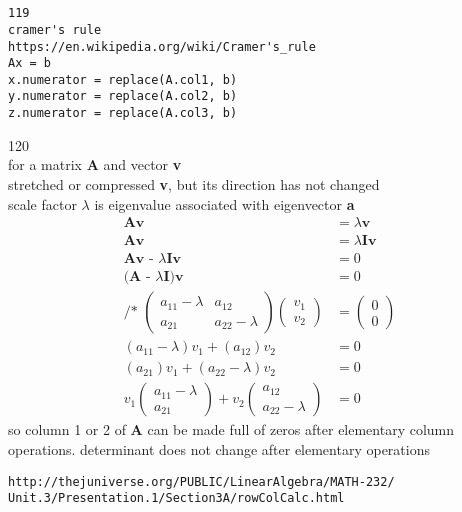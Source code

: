 \documentclass[12pt,border=4pt,multi]{article} %
\begin{document}
\section*{}
\begin{verbatim}
119
cramer's rule
https://en.wikipedia.org/wiki/Cramer's_rule
Ax = b
x.numerator = replace(A.col1, b)
y.numerator = replace(A.col2, b)
z.numerator = replace(A.col3, b)
\end{verbatim}
120\\
for a matrix \textbf{A} and vector \textbf{v}\\
stretched or compressed \textbf{v}, but its direction has not changed\\
scale factor $\lambda$ is eigenvalue associated with eigenvector \textbf{a}
\begin{align*}
\textbf{Av} &= \lambda\textbf{v}\\
\textbf{Av} &= \lambda\textbf{Iv}\\
\textbf{Av - $\lambda$Iv} &= 0\\
\textbf{(A - $\lambda$I)v} &= 0\\
\text{/* }
\begin{pmatrix}
a_{11} - \lambda & a_{12}\\
a_{21} & a_{22} - \lambda
\end{pmatrix}
\begin{pmatrix}
v_1\\
v_2
\end{pmatrix} &=
\begin{pmatrix}
0\\
0
\end{pmatrix}\\
(a_{11} - \lambda)v_1 + (a_{12})v_2 &= 0\\
(a_{21})v_1 + (a_{22} - \lambda)v_2 &= 0\\
v_1 
\begin{pmatrix}
a_{11} - \lambda\\
a_{21}
\end{pmatrix}
+
v_2
\begin{pmatrix}
a_{12}\\
a_{22} - \lambda
\end{pmatrix}
&= 0 
\end{align*}
so column 1 or 2 of \textbf{A} can be made full of zeros after elementary column operations. determinant does not change after elementary operations
\begin{verbatim}
http://thejuniverse.org/PUBLIC/LinearAlgebra/MATH-232/
Unit.3/Presentation.1/Section3A/rowColCalc.html
\end{verbatim}
\end{document}
